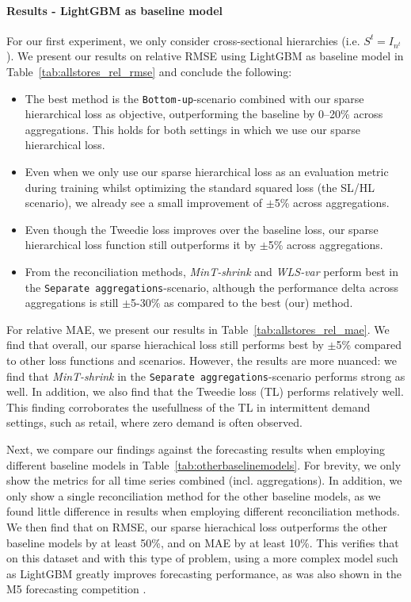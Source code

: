 \documentclass[preprint, 3p, times, twocolumn]{elsarticle}
\begin{document}
  \paragraph{Results - LightGBM as baseline model} For our first experiment, we only consider cross-sectional hierarchies (i.e. \(S^t = I_{n^t}\)). We present our results on relative RMSE using LightGBM as baseline model in Table~\ref{tab:allstores_rel_rmse} and conclude the following:
  \begin{itemize}
    \item The best method is the \texttt{Bottom-up}-scenario combined with our sparse hierarchical loss as objective, outperforming the baseline by 0--20\% across aggregations. This holds for both settings in which we use our sparse hierarchical loss.
    \item Even when we only use our sparse hierarchical loss as an evaluation metric during training whilst optimizing the standard squared loss (the SL/HL scenario), we already see a small improvement of $\pm$5\% across aggregations. 
    \item Even though the Tweedie loss improves over the baseline loss, our sparse hierarchical loss function still outperforms it by $\pm$5\% across aggregations.
    \item From the reconciliation methods, \textit{MinT-shrink} and \textit{WLS-var} perform best in the \texttt{Separate aggregations}-scenario, although the performance delta across aggregations is still $\pm$5-30\% as compared to the best (our) method.
  \end{itemize}
  For relative MAE, we present our results in Table~\ref{tab:allstores_rel_mae}. We find that overall, our sparse hierachical loss still performs best by $\pm$5\% compared to other loss functions and scenarios. However, the results are more nuanced: we find that \textit{MinT-shrink} in the \texttt{Separate aggregations}-scenario performs strong as well. In addition, we also find that the Tweedie loss (TL) performs relatively well. This finding corroborates the usefullness of the TL in intermittent demand settings, such as retail, where zero demand is often observed.

  Next, we compare our findings against the forecasting results when employing different baseline models in Table~\ref{tab:otherbaselinemodels}. For brevity, we only show the metrics for all time series combined (incl. aggregations). In addition, we only show a single reconciliation method for the other baseline models, as we found little difference in results when employing different reconciliation methods. We then find that on RMSE, our sparse hierachical loss outperforms the other baseline models by at least 50\%, and on MAE by at least 10\%. This verifies that on this dataset and with this type of problem, using a more complex model such as LightGBM greatly improves forecasting performance, as was also shown in the M5 forecasting competition \cite{makridakis_m5_2022}.
\end{document}
